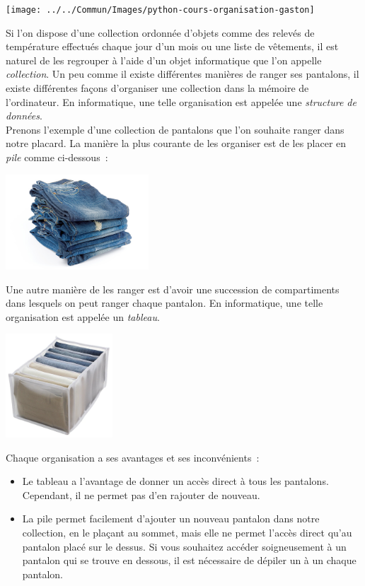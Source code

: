 \documentclass{magnoliaold}
\begin{document}
\hfill\texttt{[image: ../../Commun/Images/python-cours-organisation-gaston]}

\magtoc

\bigskip

Si l'on dispose d'une collection ordonnée d'objets comme des relevés de température effectués
chaque jour d'un mois ou une liste de vêtements, il est naturel de les regrouper à l'aide d'un objet
informatique que l'on appelle \emph{collection}. Un peu comme il existe différentes manières de
ranger ses pantalons, il existe différentes façons d'organiser une collection dans
la mémoire de l'ordinateur. En informatique, une telle organisation est appelée une
\emph{structure de données}.\\

Prenons l'exemple d'une collection de pantalons que l'on souhaite ranger dans notre placard. La manière
la plus courante de les organiser est de les placer en \emph{pile} comme ci-dessous~:
\begin{center}
\includegraphics[width=0.4\textwidth]{../../commun/images/python-cours-jeans-pile}
\end{center}
Une autre manière de les ranger est d'avoir une succession de compartiments
dans lesquels on peut ranger chaque pantalon. En informatique, une telle organisation est appelée
un \emph{tableau}.
\begin{center}
\includegraphics[width=0.3\textwidth]{../../commun/images/python-cours-jeans-tableau}
\end{center}
Chaque organisation a ses avantages et ses inconvénients~:
\begin{itemize}
\item Le tableau a l'avantage de donner un accès direct à tous les pantalons. Cependant, il ne permet
  pas d'en rajouter de nouveau.
\item La pile permet facilement d'ajouter un nouveau pantalon dans notre collection, en
  le plaçant au sommet, mais elle ne permet l'accès direct qu'au pantalon placé sur le dessus.
  Si vous souhaitez accéder soigneusement à un pantalon qui se trouve en dessous, il est
  nécessaire de dépiler un à un chaque pantalon.
\end{itemize}
\end{document}
